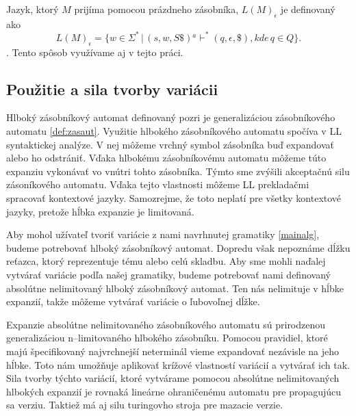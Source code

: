 Jazyk, ktorý $M$ prijíma pomocou prázdneho zásobníka, $L(M)_\epsilon$ je definovaný ako $$L(M)_\epsilon = \{w \in \Sigma^* \,| \, (s, w, S\$) {}^a\vdash^* (q, \epsilon, \$), kde \, q \in Q\}.$$. Tento spôsob využívame aj v tejto práci.

\subsection{Použitie a sila tvorby variácii}
Hlboký zásobníkový automat definovaný pozri \cite{FITPUB10498} je generalizáciou zásobníkového automatu \ref{def:zasaut}. Využitie hlbokého zásobníkového automatu spočíva v LL syntaktickej analýze. V nej môžeme vrchný symbol zásobníka buď expandovať alebo ho odstrániť. Vďaka hlbokému zásobníkovému automatu môžeme túto expanziu vykonávať vo vnútri tohto zásobníka. Týmto sme zvýšili akceptačnú silu zásoníkového automatu. Vďaka tejto vlastnosti môžeme LL prekladačmi spracovať kontextové jazyky. Samozrejme, že toto neplatí pre všetky kontextové jazyky, pretože hĺbka expanzie je limitovaná.

Aby mohol užívateľ tvoriť variácie z nami navrhnutej gramatiky \ref{mainalg}, budeme potrebovať hlboký zásobníkový automat. Dopredu však nepoznáme dĺžku reťazca, ktorý reprezentuje tému alebo celú skladbu. Aby sme mohli naďalej vytvárať variácie podľa našej gramatiky, budeme potrebovať nami definovaný absolútne nelimitovaný hlboký zásobníkový automat. Ten nás nelimituje v hĺbke expanzií, takže môžeme vytvárať variácie o ľubovoľnej dĺžke.

Expanzie absolútne nelimitovaného zásobníkového automatu sú prirodzenou generalizáciou n--limitovaného hlbokého zásobníku. Pomocou pravidiel, ktoré majú špecifikovaný najvrchnejší neterminál vieme expandovať nezávisle na jeho hĺbke. Toto nám umožňuje aplikovať krížové vlastností variácií a vytvárať ich tak. Sila tvorby týchto variácií, ktoré vytvárame pomocou absolútne nelimitovaných hlbokých expanzií je rovnaká lineárne ohraničenému automatu pre propagujúcu sa verziu. Taktiež má aj silu turingovho stroja pre mazacie verzie.

